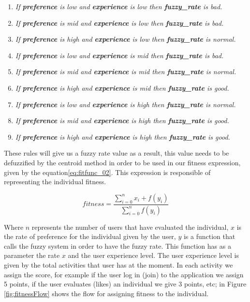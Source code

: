 \begin{enumerate}
	\item \textit{If \textbf{preference} is low and
		\textbf{experience} is low then \textbf{fuzzy\_rate} is bad.}
	\item \textit{If \textbf{preference} is mid and
		\textbf{experience} is low  then \textbf{fuzzy\_rate} is bad.}
	\item \textit{If \textbf{preference} is high and
		\textbf{experience} is low  then \textbf{fuzzy\_rate} is normal.}
	\item \textit{If \textbf{preference} is low and
		\textbf{experience} is mid then \textbf{fuzzy\_rate} is bad.}
	\item \textit{If \textbf{preference} is mid and
		\textbf{experience} is mid  then \textbf{fuzzy\_rate} is normal.}
	\item \textit{If \textbf{preference} is high and
		\textbf{experience} is mid  then \textbf{fuzzy\_rate} is good.}
	\item \textit{If \textbf{preference} is low and
		\textbf{experience} is high then \textbf{fuzzy\_rate} is normal.}
	\item \textit{If \textbf{preference} is mid and
		\textbf{experience} is high  then \textbf{fuzzy\_rate} is good.}
	\item \textit{If \textbf{preference} is high and
		\textbf{experience} is high  then \textbf{fuzzy\_rate} is good.}

\end{enumerate}

These rules will give us a fuzzy rate value as a result, this value needs to
be defuzzified by the centroid method in order to be used in our fitness
expression, given by the equation\ref{eq:fitfunc_02}. This expression is responsible
of representing the individual fitness.

\begin{equation}\label{eq:fitfunc_02}
\displaystyle fitness=\frac{\sum_{i=0}^{n}x_{i}+f(y_{i})}{\sum_{i=0}^{n}f(y_{i})}
\end{equation}

Where $n$ represents  the number of  users that have evaluated the
individual, $x$ is the rate of preference for the  individual  given by the user,
$y$ is a function that calls the fuzzy system in order to have the fuzzy rate.
This function has as a parameter the rate $x$ and the user experience level.
The user experience level
is given  by the  total activities that user has at the moment. In each
activity we assign the score, for example if the user log in (join) to the
application we assign 5 points, if the user evaluates (likes) an individual we
give 3 points, etc; in Figure \ref{fig:fitnessFlow} shows the flow for assigning fitness to
the individual.

